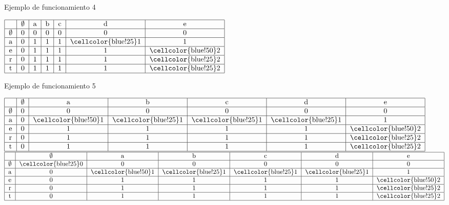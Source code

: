 \documentclass{beamer}
\begin{document}
\begin{frame}{Ejemplo de funcionamiento 4}
\begin{center}
			    \)
	    		\hspace{.1in}
	    		\(
				\begin{tabular}{ | c | c | c | c | c | c | c | }
	    				\hline
					   & $\emptyset$ & a & b  & c  & d & e \\ \hline
					$\emptyset$ & 0 & 0 & 0  & 0  & 0 & 0  \\ \hline
					a & 0 & 1 & 1 & 1 & \cellcolor{blue!25}1 & 1 \\ \hline
					e & 0 & 1 & 1 & 1 & 1 & \cellcolor{blue!50}2 \\ \hline
					r & 0 & 1 & 1 & 1 & 1 & \cellcolor{blue!25}2 \\ \hline
					t & 0  & 1 & 1 & 1 & 1 & \cellcolor{blue!25}2 \\
					\hline
				\end{tabular}
		    	\)
			\end{center}	
					
				\end{frame}	
				
				
\begin{frame}{Ejemplo de funcionamiento 5}
 			
\begin{center}
	    		\(
	  			\begin{tabular}{ | c | c | c | c | c | c | c | }
	    				\hline
					   & $\emptyset$ & a & b  & c  & d & e \\ \hline
					$\emptyset$ & 0 & 0 & 0  & 0  & 0 & 0  \\ \hline
					a & 0 & \cellcolor{blue!50}1 & \cellcolor{blue!25}1 & \cellcolor{blue!25}1 & \cellcolor{blue!25}1 & 1 \\ \hline
					e & 0 & 1 & 1 & 1 & 1 & \cellcolor{blue!50}2 \\ \hline
					r & 0 & 1 & 1 & 1 & 1 & \cellcolor{blue!25}2 \\ \hline
					t & 0  & 1 & 1 & 1 & 1 & \cellcolor{blue!25}2 \\
					\hline
				\end{tabular}
			    \)
	    		\hspace{.1in}
	    		\(
				\begin{tabular}{ | c | c | c | c | c | c | c | }
	    				\hline
					   & $\emptyset$ & a & b  & c  & d & e \\ \hline
					$\emptyset$ & \cellcolor{blue!25}0 & 0 & 0  & 0  & 0 & 0  \\ \hline
					a & 0 & \cellcolor{blue!50}1 & \cellcolor{blue!25}1 & \cellcolor{blue!25}1 & \cellcolor{blue!25}1 & 1 \\ \hline
					e & 0 & 1 & 1 & 1 & 1 & \cellcolor{blue!50}2 \\ \hline
					r & 0 & 1 & 1 & 1 & 1 & \cellcolor{blue!25}2 \\ \hline
					t & 0  & 1 & 1 & 1 & 1 & \cellcolor{blue!25}2 \\
					\hline
				\end{tabular}
		    	\)
			\end{center}	
					
				\end{frame}
				
\end{document}
